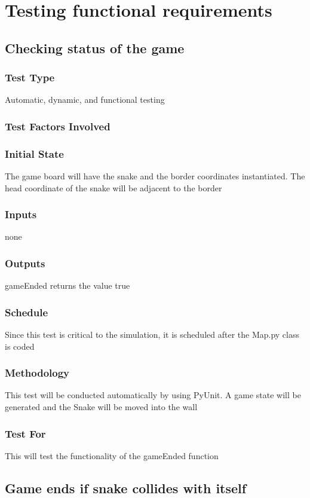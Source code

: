 \documentclass[12pt]{article}
\begin{document}
\section{Testing functional requirements}

\noindent
\subsection{Checking status of the game}
\subsubsection*{Test Type}
Automatic, dynamic, and functional testing
\subsubsection*{Test Factors Involved}
\subsubsection*{Initial State}
The game board will have the snake and the border coordinates instantiated. The head coordinate of the snake will be adjacent to the border 
\subsubsection*{Inputs}
none
\subsubsection*{Outputs}
gameEnded returns the value true
\subsubsection*{Schedule}
Since this test is critical to the simulation, it is scheduled after the Map.py class is coded
\subsubsection*{Methodology}
This test will be conducted automatically by using PyUnit. A game state will be generated and the Snake will be moved into the wall
\subsubsection*{Test For}
This will test the functionality of the gameEnded function \newline

\noindent
\subsection{Game ends if snake collides with itself}
\end{document}
